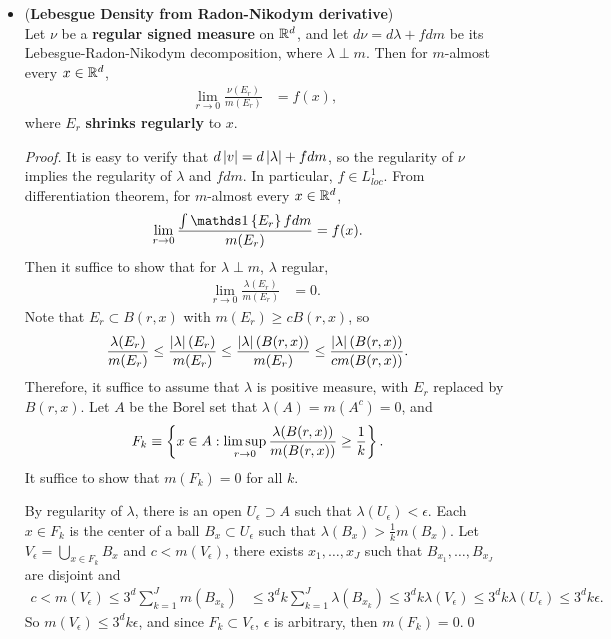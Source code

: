\documentclass[11pt]{article}
\begin{document}
\begin{itemize}
\item \begin{theorem}(\textbf{Lebesgue Density from Radon-Nikodym derivative}) \citep{folland2013real}\\
Let $\nu$ be a \textbf{regular signed measure} on ${\mathbb R}^{d}$, and let $d\nu = d\lambda+ fdm$ be its Lebesgue-Radon-Nikodym decomposition, where $\lambda \perp m$.  Then for $m$-almost every $x\in {\mathbb R}^{d}$,
\begin{align*}
\lim\limits_{r\rightarrow 0}\frac{\nu(E_{r})}{m(E_{r})} &= f(x),
\end{align*} where $E_{r}$ \textbf{shrinks regularly} to $x$.
\end{theorem}
\begin{proof}
It is easy to verify that $d\left\lvert v \right\rvert= d\left\lvert \lambda \right\rvert+ fdm$, so the regularity of $\nu$ implies the regularity of $\lambda$ and $fdm$. In particular, $f\in L_{loc}^{1}$. From differentiation theorem, for $m$-almost every $x\in {\mathbb R}^{d}$,
\begin{align*}
\lim\limits_{r\rightarrow 0}\frac{\int \ind{E_{r}}fdm}{m(E_{r})} &= f(x).
\end{align*}
Then it suffice to show that for $\lambda \perp m$, $\lambda$ regular, 
\begin{align*}
\lim\limits_{r\rightarrow 0}\frac{\lambda(E_{r})}{m(E_{r})} &= 0.
\end{align*}
Note that $E_{r} \subset B(r,x)$ with $m(E_{r})\ge c B(r,x)$, so 
\begin{align*}
\frac{\lambda(E_{r})}{m(E_{r})} \le \frac{\left\lvert \lambda \right\rvert(E_{r})}{m(E_{r})}&\le   \frac{\left\lvert \lambda \right\rvert(B(r,x))}{m(E_{r})}
\le  \frac{\left\lvert \lambda \right\rvert(B(r,x))}{c m(B(r, x))}.
\end{align*}
Therefore, it suffice to assume that $\lambda$ is positive measure, with $E_{r}$ replaced by $B(r,x)$. Let $A$ be the Borel set that $\lambda(A)= m(A^{c})= 0$, and 
\begin{align*}
F_{k}&\equiv  \left\{x\in A:  \limsup\limits_{r\rightarrow 0}\frac{\lambda(B(r,x))}{m(B(r,x))} \ge \frac{1}{k} \right\}.
\end{align*} It suffice to show that $m(F_{k})= 0$ for all $k$.

By regularity of $\lambda$, there is an open $U_{\epsilon} \supset A$ such that $\lambda(U_{\epsilon})<\epsilon$. Each $x\in F_{k}$ is the center of a ball $B_{x} \subset U_{\epsilon}$  such that $\lambda(B_{x}) > \frac{1}{k}m(B_{x})$. Let $V_{\epsilon} = \bigcup_{x\in F_{k}}B_{x}$ and $c< m(V_{\epsilon})$, there exists $x_{1}, \ldots, x_{J}$ such that $B_{x_1},\ldots, B_{x_J}$ are disjoint and 
\begin{align*}
c < m(V_{\epsilon})\le 3^{d}\sum_{k=1}^{J}m(B_{x_{k}}) &\le 3^{d}k\sum_{k=1}^{J}\lambda(B_{x_{k}})\le  3^{d}k\lambda(V_{\epsilon})
\le 3^{d}k\lambda(U_{\epsilon}) \le 3^{d}k\epsilon. 
\end{align*}
So $m(V_{\epsilon})\le 3^{d}k\epsilon$, and since $F_{k}\subset V_{\epsilon}$, $\epsilon$ is arbitrary, then $m(F_{k})= 0$.\qed
\end{proof}
\end{itemize}
\end{document}
